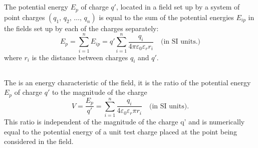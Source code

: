\subsection{}\label{16.2.5} The potential energy $E_{p}$ of charge $q'$, located in a field set up by a system of point charges $(q_{1},\, q_{2},\, \ldots , \, q_{n})$ is equal to the sum of the potential energies $E_{ip}$ in the fields set up by each of the charges separately:
\begin{equation*}%
E_{p} = \sum_{i=1}^{n} E_{ip} = q' \sum_{i=1}^{n} \frac{q_{i}}{4 \pi \varepsilon_{0} \varepsilon_{r} r_{i}} \quad \text{(in SI units.)}
\end{equation*}
where $r_{i}$ is the distance between charges $q_{i}$ and $q'$.

\subsection{}\label{16.2.6} The  is an energy characteristic of the field, it is the ratio of the potential energy $E_{p}$ of charge $q'$ to the magnitude of the charge
\begin{equation*}%
V = \frac{E_{p}}{q'} = \sum_{i = 1}^{n} \frac{q_{i}}{4 \varepsilon_{0} \varepsilon_{r} \pi r_{i}} \quad \text{(in SI units).}
\end{equation*}
This ratio is independent of the magnitude of the charge q' and is numerically equal to the potential energy of a unit test charge  placed at the point being considered in the field.


